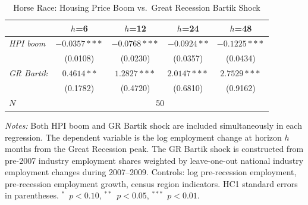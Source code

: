 \begin{table}[H]
\centering
\caption{Horse Race: Housing Price Boom vs.\ Great Recession Bartik Shock}
\begin{threeparttable}
\small
\begin{tabular}{lcccc}
\toprule
& $h$=6 & $h$=12 & $h$=24 & $h$=48 \\
\midrule
\textit{HPI boom}
 & $-0.0357***$ & $-0.0768***$ & $-0.0924**$ & $-0.1225***$ \\
 & (0.0108) & (0.0230) & (0.0357) & (0.0434) \\[6pt]
\textit{GR Bartik} & $0.4614**$ & $1.2827***$ & $2.0147***$ & $2.7529***$ \\
 & (0.1782) & (0.4720) & (0.6810) & (0.9162) \\
\midrule
$N$ & \multicolumn{4}{c}{50} \\
\bottomrule
\end{tabular}
\begin{tablenotes}[flushleft]
\small
\item \textit{Notes:} Both HPI boom and GR Bartik shock are included simultaneously in each regression. The dependent variable is the log employment change at horizon $h$ months from the Great Recession peak. The GR Bartik shock is constructed from pre-2007 industry employment shares weighted by leave-one-out national industry employment changes during 2007--2009. Controls: log pre-recession employment, pre-recession employment growth, census region indicators. HC1 standard errors in parentheses. $^{*}$~$p<0.10$, $^{**}$~$p<0.05$, $^{***}$~$p<0.01$.
\end{tablenotes}
\end{threeparttable}
\label{tab:horse}
\end{table}

